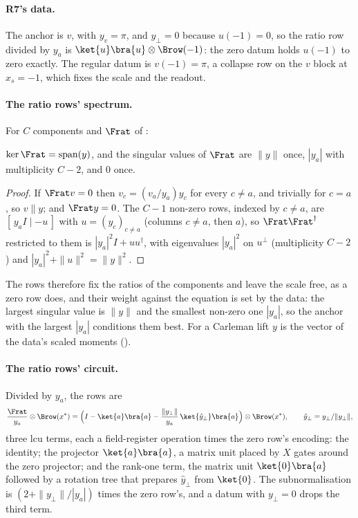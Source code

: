 \paragraph{R7's data.} The anchor is $v$, with $y_v=\pi$, and $y_\perp=0$ because $u(-1)=0$, so the ratio row divided by $y_a$ is $\ket{u}\bra{u}\otimes\Brow(-1)$: the zero datum holds $u(-1)$ to zero exactly. The regular datum is $v(-1)=\pi$, a collapse row on the $v$ block at $x_s=-1$, which fixes the scale and the readout.

\paragraph{The ratio rows' spectrum.} For $C$ components and $\Frat$ of :

\begin{proposition}
\label{prop:ratio-rows}
$\ker\Frat=\operatorname{span}(y)$, and the singular values of $\Frat$ are $\|y\|$ once, $|y_a|$ with multiplicity $C-2$, and $0$ once.
\end{proposition}
\begin{proof}
If $\Frat v=0$ then $v_c=(v_a/y_a)y_c$ for every $c\ne a$, and trivially for $c=a$, so $v\parallel y$; and $\Frat y=0$. The $C-1$ non-zero rows, indexed by $c\ne a$, are $[\,y_aI\mid-u\,]$ with $u=(y_c)_{c\ne a}$ (columns $c\ne a$, then $a$), so $\Frat\Frat^\dagger$ restricted to them is $|y_a|^2I+uu^\dagger$, with eigenvalues $|y_a|^2$ on $u^\perp$ (multiplicity $C-2$) and $|y_a|^2+\|u\|^2=\|y\|^2$.
\end{proof}
The rows therefore fix the ratios of the components and leave the scale free, as a zero row does, and their weight against the equation is set by the data: the largest singular value is $\|y\|$ and the smallest non-zero one $|y_a|$, so the anchor with the largest $|y_a|$ conditions them best. For a Carleman lift $y$ is the vector of the data's scaled moments ().

\paragraph{The ratio rows' circuit.} Divided by $y_a$, the rows are
\begin{equation}
    \frac{\Frat}{y_a}\otimes\Brow(x^*)
    =\Bigl(I-\ket{a}\bra{a}-\frac{\|y_\perp\|}{y_a}\,\ket{\hat y_\perp}\bra{a}\Bigr)\otimes\Brow(x^*),
    \qquad \hat y_\perp=y_\perp/\|y_\perp\|,
\end{equation}
three \gls{lcu} terms, each a field-register operation times the zero row's encoding: the identity; the projector $\ket{a}\bra{a}$, a matrix unit placed by $X$ gates around the zero projector; and the rank-one term, the matrix unit $\ket{0}\bra{a}$ followed by a rotation tree that prepares $\hat y_\perp$ from $\ket{0}$. The subnormalisation is $(2+\|y_\perp\|/|y_a|)$ times the zero row's, and a datum with $y_\perp=0$ drops the third term.

